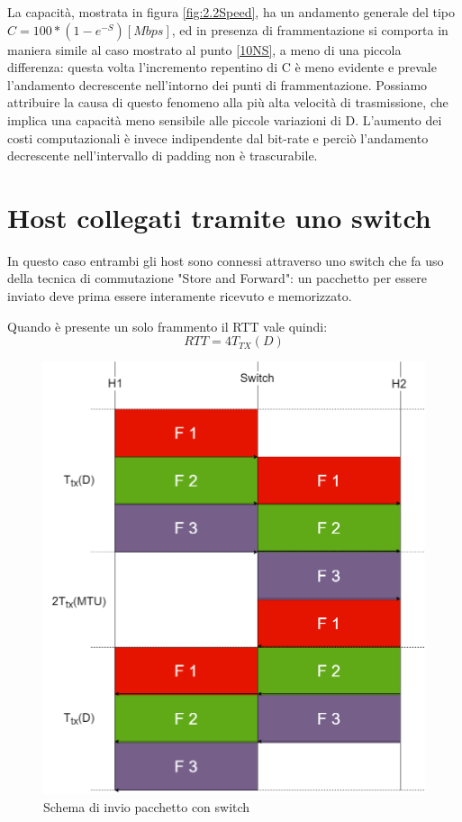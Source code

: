 \documentclass{exam}
\begin{document}
La capacità, mostrata in figura \ref{fig:2.2Speed}, ha  un andamento generale del tipo $C = 100*(1 - e^{-S})[Mbps]$, ed in presenza di frammentazione si comporta in maniera simile al caso mostrato al punto \ref{10NS}, a meno di una piccola differenza: questa volta l'incremento repentino di C è meno evidente e prevale l'andamento decrescente nell'intorno dei punti di frammentazione. Possiamo attribuire la causa di questo fenomeno alla più alta velocità di trasmissione, che implica una capacità meno sensibile alle piccole variazioni di D. L'aumento dei costi computazionali è invece indipendente dal bit-rate e perciò l'andamento decrescente nell'intervallo di padding non è trascurabile.


\section{Host collegati tramite uno switch}
In questo caso entrambi gli host sono connessi attraverso uno switch che fa uso della tecnica di commutazione "Store and Forward": un pacchetto per essere inviato deve prima essere interamente ricevuto e memorizzato. 

Quando è presente un solo frammento il RTT vale quindi:
\begin{equation}
 RTT=4T_{TX}(D)
\end{equation}

\begin{figure}[H]
	\centering
	\includegraphics[scale = 0.26]{GraficoSwitch.png}
	\caption{Schema di invio pacchetto con switch}
	\label{fig:GrafSwitch}
\end{figure}
\end{document}
